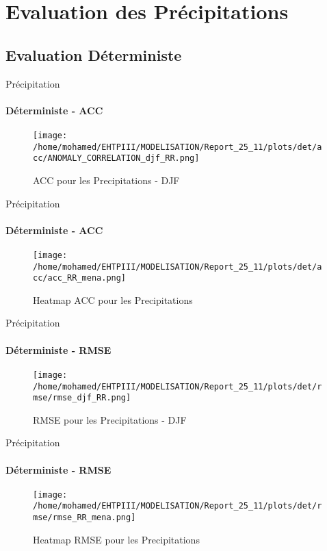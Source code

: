 \section{Evaluation des Précipitations}
\subsection{Evaluation Déterministe}
\begin{frame}{Précipitation}
\framesubtitle{Déterministe - ACC}

\begin{figure}
    \centering
    \texttt{[image: /home/mohamed/EHTPIII/MODELISATION/Report\_25\_11/plots/det/acc/ANOMALY\_CORRELATION\_djf\_RR.png]}
    \caption{ACC pour les Precipitations - DJF  }
    \label{fig:enter-label}
\end{figure}
\end{frame}

\begin{frame}{Précipitation}
\framesubtitle{Déterministe - ACC}

\begin{figure}
    \centering
    \texttt{[image: /home/mohamed/EHTPIII/MODELISATION/Report\_25\_11/plots/det/acc/acc\_RR\_mena.png]}
    \caption{Heatmap ACC pour les Precipitations  }
    \label{fig:enter-label}
\end{figure}
\end{frame}

\begin{frame}{Précipitation}
\framesubtitle{Déterministe - RMSE}

\begin{figure}
    \centering
    \texttt{[image: /home/mohamed/EHTPIII/MODELISATION/Report\_25\_11/plots/det/rmse/rmse\_djf\_RR.png]}
    \caption{RMSE pour les Precipitations - DJF  }
    \label{fig:enter-label}
\end{figure}
\end{frame}

\begin{frame}{Précipitation}
\framesubtitle{Déterministe - RMSE}

\begin{figure}
    \centering
    \texttt{[image: /home/mohamed/EHTPIII/MODELISATION/Report\_25\_11/plots/det/rmse/rmse\_RR\_mena.png]}
    \caption{Heatmap RMSE pour les Precipitations  }
    \label{fig:enter-label}
\end{figure}
\end{frame}

